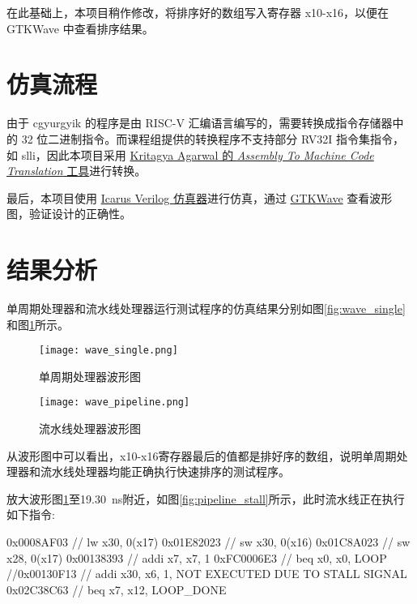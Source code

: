 \documentclass[lang=zh]{sjtureport}
\begin{document}
在此基础上，本项目稍作修改，将排序好的数组写入寄存器 x10-x16，以便在 GTKWave 中查看排序结果。

\section{仿真流程}

由于 cgyurgyik 的程序是由 RISC-V 汇编语言编写的，需要转换成指令存储器中的 32 位二进制指令。而课程组提供的转换程序不支持部分 RV32I 指令集指令，如 slli，因此本项目采用 \href{https://github.com/Kritagya-Agarwal/Assembly-To-Machine-Code-RISC-V}{Kritagya Agarwal 的 \textit{Assembly To Machine Code Translation} 工具}进行转换。

最后，本项目使用 \href{https://github.com/steveicarus/iverilog}{Icarus Verilog 仿真器}进行仿真，通过 \href{https://github.com/gtkwave/gtkwave}{GTKWave} 查看波形图，验证设计的正确性。

\section{结果分析}

单周期处理器和流水线处理器运行测试程序的仿真结果分别如图\ref{fig:wave_single}和图\ref{fig:wave_pipeline}所示。

\begin{figure}[!htp]
	\centering
	\begin{minipage}{\textwidth}
		\centering
		\texttt{[image: wave\_single.png]}
		\caption{单周期处理器波形图}
		\label{fig:wave_single}
	\end{minipage}
	\begin{minipage}{\textwidth}
		\centering
		\texttt{[image: wave\_pipeline.png]}
		\caption{流水线处理器波形图}
		\label{fig:wave_pipeline}
	\end{minipage}
\end{figure}

从波形图中可以看出，x10-x16寄存器最后的值都是排好序的数组，说明单周期处理器和流水线处理器均能正确执行快速排序的测试程序。

放大波形图\ref{fig:wave_pipeline}至\SI{19.30}{\ns}附近，如图\ref{fig:pipeline_stall}所示，此时流水线正在执行如下指令:

\begin{codeblock}
0x0008AF03	// lw x30, 0(x17)
0x01E82023	// sw x30, 0(x16)
0x01C8A023	// sw x28, 0(x17)
0x00138393	// addi x7, x7, 1
0xFC0006E3	// beq x0, x0, LOOP
//0x00130F13	// addi x30, x6, 1, NOT EXECUTED DUE TO STALL SIGNAL
0x02C38C63	// beq x7, x12, LOOP_DONE
\end{codeblock}
\end{document}
